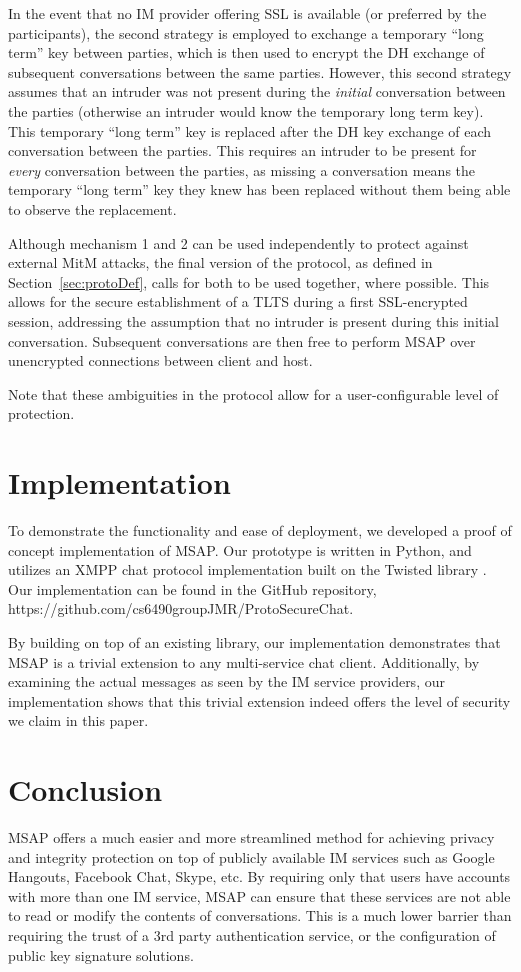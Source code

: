 \documentclass[twoside,10pt]{article}
\begin{document}
\begin{multicols}{2}
In the event that no IM provider offering SSL is available (or preferred by the participants), the second strategy is employed to exchange a temporary ``long term'' key between parties, which is then used to encrypt the DH exchange of subsequent conversations between the same parties.  However, this second strategy assumes that an intruder was not present during the \emph{initial} conversation between the parties (otherwise an intruder would know the temporary long term key).  This temporary ``long term'' key is replaced after the DH key exchange of each conversation between the parties.  This requires an intruder to be  present for \emph{every} conversation between the parties, as missing a conversation means the temporary ``long term'' key they knew has been replaced without them being able to observe the replacement.

Although mechanism 1 and 2 can be used independently to protect against external MitM attacks, the final version of the protocol, as defined in Section~\ref{sec:protoDef}, calls for both to be used together, where possible.  This allows for the secure establishment of a TLTS during a first SSL-encrypted session, addressing the assumption that no intruder is present during this initial conversation.  Subsequent conversations are then free to perform MSAP over unencrypted connections between client and host.

Note that these ambiguities in the protocol allow for a user-configurable level of protection.

\section{Implementation}
To demonstrate the functionality and ease of deployment, we developed a proof of concept implementation of MSAP.  Our prototype is written in Python, and utilizes an XMPP chat protocol implementation built on the Twisted library \cite{TwistedHomepage}.  Our implementation can be found in the GitHub repository, https://github.com/cs6490groupJMR/ProtoSecureChat.

By building on top of an existing library, our implementation demonstrates that MSAP is a trivial extension to any multi-service chat client.  Additionally, by examining the actual messages as seen by the IM service providers, our implementation shows that this trivial extension indeed offers the level of security we claim in this paper.

\section{Conclusion}
MSAP offers a much easier and more streamlined method for achieving privacy and integrity protection on top of publicly available IM services such as Google Hangouts, Facebook Chat, Skype, etc.  By requiring only that users have accounts with more than one IM service, MSAP can ensure that these services are not able to read or modify the contents of conversations.  This is a much lower barrier than requiring the trust of a 3rd party authentication service, or the configuration of public key signature solutions.


\end{multicols}
\end{document}
